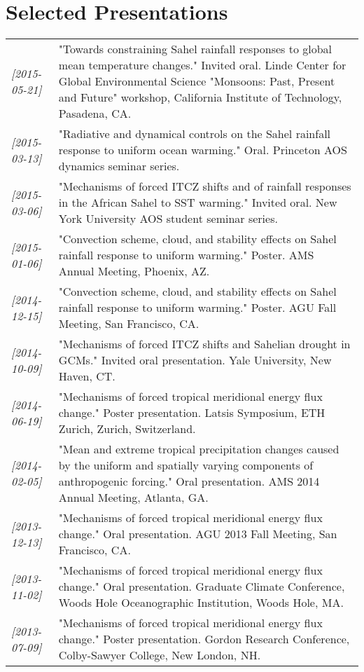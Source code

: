 \documentclass{article}
\begin{document}
\section*{Selected Presentations}
\label{sec-8}
\begin{center}
\begin{tabularx}{\textwidth}{lX}
\textit{[2015-05-21]} & "Towards constraining Sahel rainfall responses to global mean temperature changes."  Invited oral.  Linde Center for Global Environmental Science "Monsoons: Past, Present and Future" workshop, California Institute of Technology, Pasadena, CA.\\
\textit{[2015-03-13]} & "Radiative and dynamical controls on the Sahel rainfall response to uniform ocean warming."  Oral.  Princeton AOS dynamics seminar series.\\
\textit{[2015-03-06]} & "Mechanisms of forced ITCZ shifts and of rainfall responses in the African Sahel to SST warming."  Invited oral.  New York University AOS student seminar series.\\
\textit{[2015-01-06]} & "Convection scheme, cloud, and stability effects on Sahel rainfall response to uniform warming."  Poster.  AMS Annual Meeting, Phoenix, AZ.\\
\textit{[2014-12-15]} & "Convection scheme, cloud, and stability effects on Sahel rainfall response to uniform warming."  Poster.  AGU Fall Meeting, San Francisco, CA.\\
\textit{[2014-10-09]} & "Mechanisms of forced ITCZ shifts and Sahelian drought in GCMs."  Invited oral presentation.  Yale University, New Haven, CT.\\
\textit{[2014-06-19]} & "Mechanisms of forced tropical meridional energy flux change."  Poster presentation.  Latsis Symposium, ETH Zurich, Zurich, Switzerland.\\
\textit{[2014-02-05]} & "Mean and extreme tropical precipitation changes caused by the uniform and spatially varying components of anthropogenic forcing."  Oral presentation.  AMS 2014 Annual Meeting, Atlanta, GA.\\
\textit{[2013-12-13]} & "Mechanisms of forced tropical meridional energy flux change."  Oral presentation.  AGU 2013 Fall Meeting, San Francisco, CA.\\
\textit{[2013-11-02]} & "Mechanisms of forced tropical meridional energy flux change."  Oral presentation.  Graduate Climate Conference, Woods Hole Oceanographic Institution, Woods Hole, MA.\\
\textit{[2013-07-09]} & "Mechanisms of forced tropical meridional energy flux change."  Poster presentation.  Gordon Research Conference, Colby-Sawyer College, New London, NH.\\

\end{tabularx}
\end{center}
\end{document}
